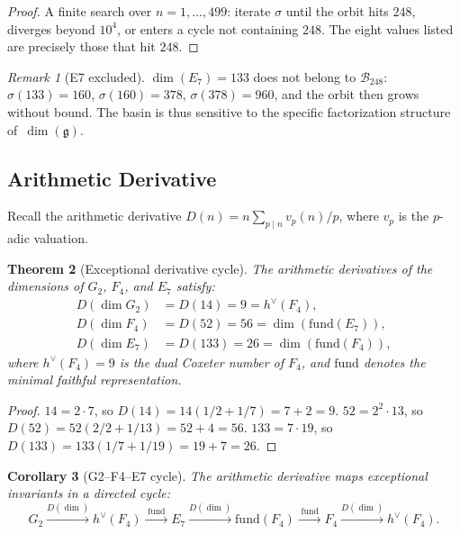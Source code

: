 \documentclass[11pt]{amsart}
\theoremstyle{plain}
\newtheorem{theorem}{Theorem}[section]
\newtheorem{corollary}[theorem]{Corollary}
\theoremstyle{definition}
\theoremstyle{remark}
\newtheorem{remark}[theorem]{Remark}
\begin{document}
\begin{proof}
A finite search over $n = 1, \ldots, 499$: iterate $\sigma$ until the
orbit hits $248$, diverges beyond $10^4$, or enters a cycle not containing
$248$.  The eight values listed are precisely those that hit $248$.
\end{proof}

\begin{remark}[E7 excluded]
$\dim(E_7) = 133$ does not belong to $\mathcal{B}_{248}$:
$\sigma(133) = 160$, $\sigma(160) = 378$, $\sigma(378) = 960$, and the
orbit then grows without bound.  The basin is thus sensitive to the
specific factorization structure of~$\dim(\mathfrak{g})$.
\end{remark}

\subsection{Arithmetic Derivative}\label{sec:arith-deriv}

Recall the arithmetic derivative $D(n) = n \sum_{p \mid n} v_p(n)/p$,
where $v_p$ is the $p$-adic valuation.

\begin{theorem}[Exceptional derivative cycle]\label{thm:arith-deriv-cycle}
The arithmetic derivatives of the dimensions of $G_2$, $F_4$, and $E_7$
satisfy:
\begin{align*}
  D(\dim G_2) &= D(14) = 9 = h^\vee(F_4),\\
  D(\dim F_4) &= D(52) = 56 = \dim(\mathrm{fund}(E_7)),\\
  D(\dim E_7) &= D(133) = 26 = \dim(\mathrm{fund}(F_4)),
\end{align*}
where $h^\vee(F_4) = 9$ is the dual Coxeter number of $F_4$, and
$\mathrm{fund}$ denotes the minimal faithful representation.
\end{theorem}

\begin{proof}
$14 = 2 \cdot 7$, so $D(14) = 14(1/2 + 1/7) = 7 + 2 = 9$.
$52 = 2^2 \cdot 13$, so $D(52) = 52(2/2 + 1/13) = 52 + 4 = 56$.
$133 = 7 \cdot 19$, so $D(133) = 133(1/7 + 1/19) = 19 + 7 = 26$.
\end{proof}

\begin{corollary}[G2--F4--E7 cycle]\label{cor:gfe-cycle}
The arithmetic derivative maps exceptional invariants in a directed cycle:
\[
  G_2 \xrightarrow{D(\dim)} h^\vee(F_4)
      \xrightarrow{\;\text{fund}\;} E_7
      \xrightarrow{D(\dim)} \mathrm{fund}(F_4)
      \xrightarrow{\;\text{fund}\;} F_4
      \xrightarrow{D(\dim)} h^\vee(F_4).
\]
\end{corollary}
\end{document}
